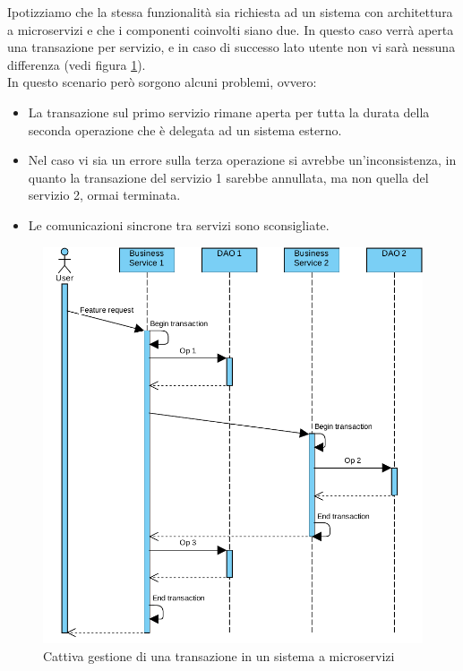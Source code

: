 Ipotizziamo che la stessa funzionalità sia richiesta ad un sistema con architettura a microservizi e che i componenti coinvolti siano due.
In questo caso verrà aperta una transazione per servizio, e in caso di successo lato utente non vi sarà nessuna differenza (vedi figura \ref{fig:micro-transaction-err}).\\
In questo scenario però sorgono alcuni problemi, ovvero:
\begin{itemize}
	\item La transazione sul primo servizio rimane aperta per tutta la durata della seconda operazione che è delegata ad un sistema esterno.
	\item Nel caso vi sia un errore sulla terza operazione si avrebbe un'inconsistenza, in quanto la transazione del servizio 1 sarebbe annullata, ma non quella del servizio 2, ormai terminata.
	\item Le comunicazioni sincrone tra servizi sono sconsigliate.
\end{itemize}

\begin{figure}[h]
	\centering
	\includegraphics[width=\textwidth]{img/microservices-transaction-error}
	\caption{Cattiva gestione di una transazione in un sistema a microservizi}
	\label{fig:micro-transaction-err}
\end{figure}

